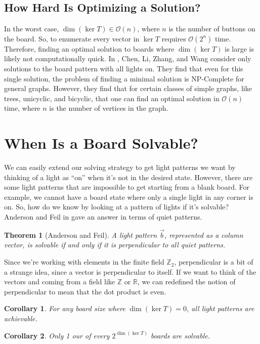 \documentclass[a4paper]{article}
\renewcommand{\O}{\mathcal{O}}
\newcommand{\Z}{\mathbb{Z}}
\newcommand{\R}{\mathbb{R}}
\newtheorem*{theorem}{Theorem}
\newtheorem*{corollary}{Corollary}
\begin{document}
	\subsection{How Hard Is Optimizing a Solution?}
	In the worst case, $\dim{(\ker{T})} \in \O(n)$, where $n$ is the number of buttons on the board.
	So, to enumerate every vector in $\ker{T}$ requires $\O(2^n)$ time.
	Therefore, finding an optimal solution to boards where $\dim{(\ker{T})}$ is large is likely not computationally quick.
	In \cite{CHEN200493}, Chen, Li, Zhang, and Wang consider only solutions to the board pattern with all lights on.
	They find that even for this single solution, the problem of finding a minimal solution is NP-Complete for general graphs.
	However, they find that for certain classes of simple graphs, like trees, unicyclic, and bicyclic, that one can find an optimal solution in $\O(n)$ time, where $n$ is the number of vertices in the graph.
	
	\section{When Is a Board Solvable?}
	We can easily extend our solving strategy to get light patterns we want by thinking of a light as ``on'' when it's not in the desired state.
	However, there are some light patterns that are impossible to get starting from a blank board.
	For example, we cannot have a board state where only a single light in any corner is on.
	So, how do we know by looking at a pattern of lights if it's solvable? \\
	
	Anderson and Feil in \cite{anderson_feil} gave an answer in terms of quiet patterns.
	\begin{theorem}[Anderson and Feil]
		A light pattern $\vec{b}$, represented as a column vector, is solvable if and only if it is perpendicular to all quiet patterns.
	\end{theorem}
	Since we're working with elements in the finite field $\Z_2$, perpendicular is a bit of a strange idea, since a vector is perpendicular to itself.
	If we want to think of the vectors and coming from a field like $\Z$ or $\R$, we can redefined the notion of perpendicular to mean that the dot product is even.
	\begin{corollary}
		For any board size where $\dim{(\ker{T})} = 0$, all light patterns are achievable.
	\end{corollary}
	\begin{corollary}
		Only 1 our of every $2^{\dim{(\ker{T})}}$ boards are solvable.
	\end{corollary}
\end{document}
